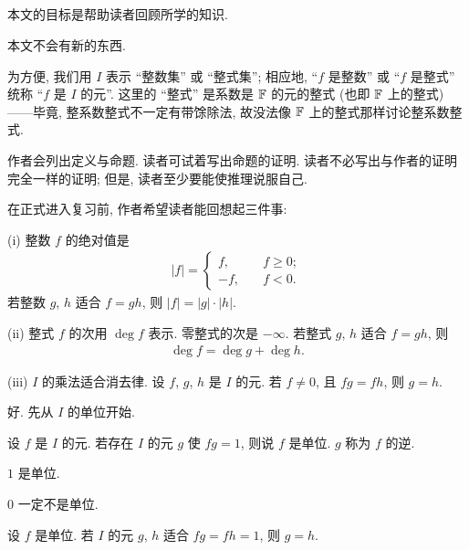 \subsection*{}

本文的目标是帮助读者回顾所学的知识.

本文不会有新的东西.

为方便, 我们用 $I$ 表示 ``整数集'' 或 ``整式集''; 相应地, ``$f$ 是整数'' 或 ``$f$ 是整式'' 统称 ``$f$ 是 $I$ 的元''. 这里的 ``整式'' 是系数是 $\mathbb{F}$ 的元的整式 (也即 $\mathbb{F}$ 上的整式)——毕竟, 整系数整式不一定有带馀除法, 故没法像 $\mathbb{F}$ 上的整式那样讨论整系数整式.

作者会列出定义与命题. 读者可试着写出命题的证明. 读者不必写出与作者的证明完全一样的证明; 但是, 读者至少要能使推理说服自己.

在正式进入复习前, 作者希望读者能回想起三件事:

(i) 整数 $f$ 的绝对值是
\begin{align*}
    |f| = \begin{cases}
        f,  & \quad f \geq 0; \\
        -f, & \quad f < 0.
    \end{cases}
\end{align*}
若整数 $g$, $h$ 适合 $f = gh$, 则 $|f| = |g| \cdot |h|$.

(ii) 整式 $f$ 的次用 $\deg f$ 表示. 零整式的次是 $-\infty$. 若整式 $g$, $h$ 适合 $f = gh$, 则
\begin{align*}
    \deg f = \deg g + \deg h.
\end{align*}

(iii) $I$ 的乘法适合消去律. 设 $f$, $g$, $h$ 是 $I$ 的元. 若 $f \neq 0$, 且 $fg = fh$, 则 $g = h$.

好. 先从 $I$ 的单位开始.

\begin{definition}
    设 $f$ 是 $I$ 的元. 若存在 $I$ 的元 $g$ 使 $fg = 1$, 则说 $f$ 是单位. $g$ 称为 $f$ 的逆.
\end{definition}

\begin{proposition}
    $1$ 是单位.
\end{proposition}

\begin{proposition}
    $0$ 一定不是单位.
\end{proposition}

\begin{proposition}
    设 $f$ 是单位. 若 $I$ 的元 $g$, $h$ 适合 $fg = fh = 1$, 则 $g = h$.
\end{proposition}

